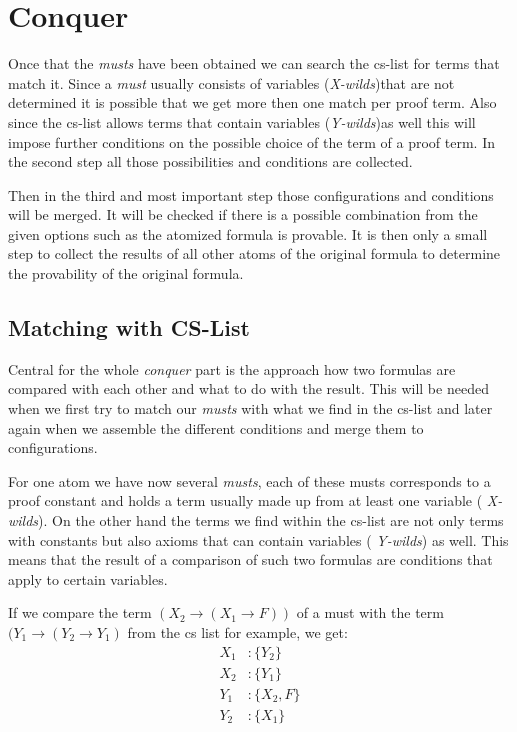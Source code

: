 \section{Conquer}

Once that the \emph{musts} have been obtained we can search the cs-list for terms that match it. Since a \emph{must} usually consists of variables (\emph{X-wilds})that are not determined it is possible that we get more then one match per proof term. Also since the cs-list allows terms that contain variables (\emph{Y-wilds})as well this will impose further conditions on the possible choice of the term of a proof term. In the second step all those possibilities and conditions are collected.

Then in the third and most important step those configurations and conditions will be merged. It will be checked if there is a possible combination from the given options such as the atomized formula is provable. It is then only a small step to collect the results of all other atoms of the original formula to determine the provability of the original formula. 


\subsection{Matching with CS-List}
Central for the whole \emph{conquer} part is the approach how two formulas are compared with each other and what to do with the result. This will be needed when we first try to match our \emph{musts} with what we find in the cs-list and later again when we assemble the different conditions and merge them to configurations.

For one atom we have now several \emph{musts}, each of these musts corresponds to a proof constant and holds a term usually made up from at least one variable ( \emph{X-wilds}). On the other hand the terms we find within the cs-list are not only terms with constants but also axioms that can contain variables ( \emph{Y-wilds}) as well. This means that the result of a comparison of such two formulas are conditions that apply to certain variables. 

If we compare the term $(X_2 \rightarrow (X_1 \rightarrow F))$ of a must with the term $(Y_1 \rightarrow (Y_2 \rightarrow Y_1)$ from the cs list for example, we get:
\begin{align*}
	X_1 &: \{Y_2\} \\
	X_2 &: \{Y_1\} \\
	Y_1 &: \{X_2, F\} \\
	Y_2 &: \{X_1\} 
\end{align*}

